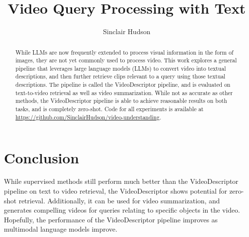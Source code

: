 \documentclass{article}
\title{Video Query Processing with Text}
\author{Sinclair Hudson}
\begin{document}
\maketitle

\begin{abstract}
      While LLMs are now frequently extended to process visual information in the form of images, they are not yet commonly used to process video.
      This work explores a general pipeline that leverages large language models (LLMs) to convert video into textual descriptions, and then further retrieve clips relevant to a query using those textual descriptions.
      The pipeline is called the VideoDescriptor pipeline, and is evaluated on text-to-video retrieval as well as video summarization.
      While not as accurate as other methods, the VideoDescriptor pipeline is able to achieve reasonable results on both tasks, and is completely zero-shot.
      Code for all experiments is available at \url{https://github.com/SinclairHudson/video-understanding}.
\end{abstract}













\section{Conclusion}

While supervised methods still perform much better than the VideoDescriptor pipeline on text to video retrieval, the VideoDescriptor shows potential for zero-shot retrieval.
Additionally, it can be used for video summarization, and generates compelling videos for queries relating to specific objects in the video.
Hopefully, the performance of the VideoDescriptor pipeline improves as multimodal language models improve.



\end{document}
